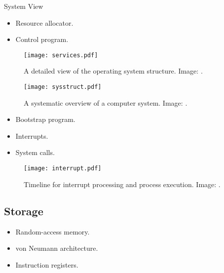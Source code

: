 \documentclass{beamer}
\begin{document}
\begin{frame}{\insertsubsectionhead}{System View}
  \begin{itemize}
    \item Resource allocator.
    \item Control program.
  \end{itemize}
\end{frame}

\begin{frame}{\insertsubsectionhead}
  \begin{figure}
    \texttt{[image: services.pdf]}
    \caption{A detailed view of the operating system structure.
      Image: \cite[p.\ 50]{Silberschatz2009osc}.
    }
  \end{figure}
\end{frame}

\begin{frame}{\insertsubsectionhead}
  \begin{figure}
    \texttt{[image: sysstruct.pdf]}
    \caption{A systematic overview of a computer system.
      Image: \cite[p.\ 8]{Silberschatz2009osc}.
    }
  \end{figure}
\end{frame}

\begin{frame}{\insertsubsectionhead}
  \begin{itemize}
    \item Bootstrap program.
    \item Interrupts.
    \item System calls.
  \end{itemize}
\end{frame}

\begin{frame}{\insertsubsectionhead}
  \begin{figure}
    \texttt{[image: interrupt.pdf]}
    \caption{Timeline for interrupt processing and process execution.
      Image: \cite[p.\ 9]{Silberschatz2009osc}.
    }
  \end{figure}
\end{frame}

\subsection{Storage}

\begin{frame}{\insertsubsectionhead}
  \begin{itemize}
    \item Random-access memory.
    \item von Neumann architecture.
    \item Instruction registers.
  \end{itemize}
\end{frame}
\end{document}
